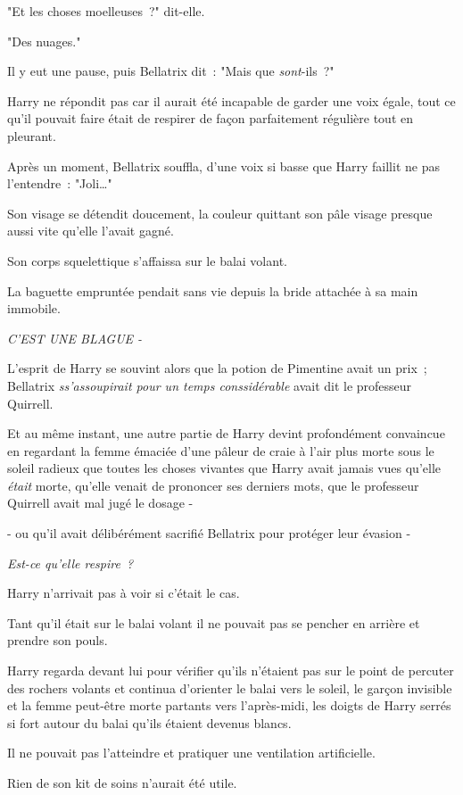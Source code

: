 "Et les choses moelleuses~?" dit-elle.

"Des nuages."

Il y eut une pause, puis Bellatrix dit~: "Mais que \emph{sont}-ils~?"

Harry ne répondit pas car il aurait été incapable de garder une voix égale, tout ce qu'il pouvait faire était de respirer de façon parfaitement régulière tout en pleurant.

Après un moment, Bellatrix souffla, d'une voix si basse que Harry faillit ne pas l'entendre~: "Joli…"

Son visage se détendit doucement, la couleur quittant son pâle visage presque aussi vite qu'elle l'avait gagné.

Son corps squelettique s'affaissa sur le balai volant.

La baguette empruntée pendait sans vie depuis la bride attachée à sa main immobile.

\emph{C'EST UNE BLAGUE -}

L'esprit de Harry se souvint alors que la potion de Pimentine avait un prix~; Bellatrix \emph{ss'assoupirait pour un temps conssidérable} avait dit le professeur Quirrell.

Et au même instant, une autre partie de Harry devint profondément convaincue en regardant la femme émaciée d'une pâleur de craie à l'air plus morte sous le soleil radieux que toutes les choses vivantes que Harry avait jamais vues qu'elle \emph{était} morte, qu'elle venait de prononcer ses derniers mots, que le professeur Quirrell avait mal jugé le dosage -

- ou qu'il avait délibérément sacrifié Bellatrix pour protéger leur évasion -

\emph{Est-ce qu'elle respire~?}

Harry n'arrivait pas à voir si c'était le cas.

Tant qu'il était sur le balai volant il ne pouvait pas se pencher en arrière et prendre son pouls.

Harry regarda devant lui pour vérifier qu'ils n'étaient pas sur le point de percuter des rochers volants et continua d'orienter le balai vers le soleil, le garçon invisible et la femme peut-être morte partants vers l'après-midi, les doigts de Harry serrés si fort autour du balai qu'ils étaient devenus blancs.

Il ne pouvait pas l'atteindre et pratiquer une ventilation artificielle.

Rien de son kit de soins n'aurait été utile.

